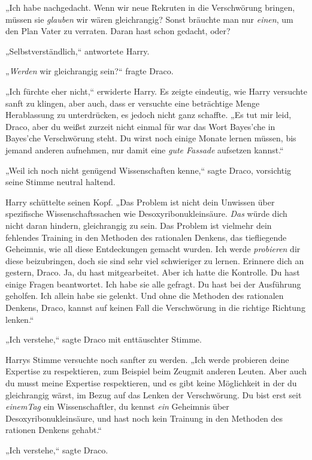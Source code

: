 {„Ich habe nachgedacht. Wenn wir neue Rekruten in die Verschwörung bringen, müssen sie \emph{glauben} wir wären gleichrangig? Sonst bräuchte man nur \emph{einen}, um den Plan Vater zu verraten. Daran hast schon gedacht, oder?

„Selbstverständlich,“ antwortete Harry.

„\emph{Werden} wir gleichrangig sein?“ fragte Draco.

„Ich fürchte eher nicht,“ erwiderte Harry. Es zeigte eindeutig, wie Harry versuchte sanft zu klingen, aber auch, dass er versuchte eine beträchtige Menge Herablassung zu unterdrücken, es jedoch nicht ganz schaffte. „Es tut mir leid, Draco, aber du weißst zurzeit nicht einmal für war das Wort Bayes'che in Bayes'che Verschwörung steht. Du wirst noch einige Monate lernen müssen, bis jemand anderen aufnehmen, nur damit eine \emph{gute Fassade} aufsetzen kannst.“

„Weil ich noch nicht genügend Wissenschaften kenne,“ sagte Draco, vorsichtig seine Stimme neutral haltend.

Harry schüttelte seinen Kopf. „Das Problem ist nicht dein Unwissen über spezifische Wissenschaftssachen wie Desoxyribonukleinsäure. \emph{Das} würde dich nicht daran hindern, gleichrangig zu sein. Das Problem ist vielmehr dein fehlendes Training in den Methoden des rationalen Denkens, das tiefliegende Geheimnis, wie all diese Entdeckungen gemacht wurden. Ich werde \emph{probieren} dir diese beizubringen, doch sie sind sehr viel schwieriger zu lernen. Erinnere dich an gestern, Draco. Ja, du hast mitgearbeitet. Aber ich hatte die Kontrolle. Du hast einige Fragen beantwortet. Ich habe sie alle gefragt. Du hast bei der Ausführung geholfen. Ich allein habe sie gelenkt. Und ohne die Methoden des rationalen Denkens, Draco, kannst auf keinen Fall die Verschwörung in die richtige Richtung lenken.“

„Ich verstehe,“ sagte Draco mit enttäuschter Stimme.

Harrys Stimme versuchte noch sanfter zu werden. „Ich werde probieren deine Expertise zu respektieren, zum Beispiel beim Zeugmit anderen Leuten. Aber auch du musst meine Expertise respektieren, und es gibt keine Möglichkeit in der du gleichrangig wärst, im Bezug auf das Lenken der Verschwörung. Du bist erst seit \emph{einemTag} ein Wissenschaftler, du kennst \emph{ein} Geheimnis über Desoxyribonukleinsäure, und hast noch kein Trainung in den Methoden des rationen Denkens gehabt.“

„Ich verstehe,“ sagte Draco.

}
